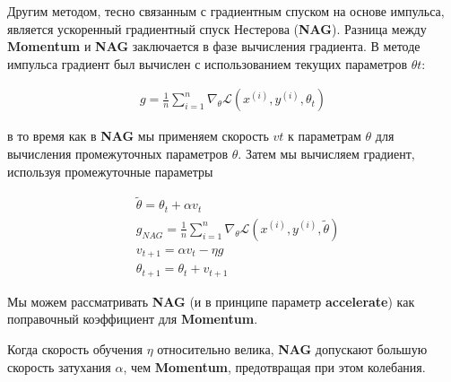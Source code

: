 {}\documentclass{article}
\begin{document}
    Другим методом, тесно связанным с градиентным спуском на основе импульса,
    является ускоренный градиентный спуск Нестерова (\textbf{NAG}).
    Разница между \textbf{Momentum} и \textbf{NAG} заключается в фазе вычисления градиента.
    В методе импульса градиент был вычислен с использованием текущих параметров $\theta t$:

    \begin{align}
        g=\frac{1}{n} \sum_{i=1}^n \nabla_\theta \mathcal{L}\left(x^{(i)}, y^{(i)}, \theta_t\right)
    \end{align}

    в то время как в \textbf{NAG} мы применяем скорость $vt$ к параметрам $\theta$ для вычисления
    промежуточных параметров $\theta$.
    Затем мы вычисляем градиент, используя промежуточные параметры

    \begin{equation}
        \begin{aligned}
            & \tilde{\theta}=\theta_t+\alpha v_t \\
            & g_{N A G} =\frac{1}{n} \sum_{i=1}^n \nabla_\theta \mathcal{L}\left(x^{(i)}, y^{(i)}, \tilde{\theta}\right) \\
            & v_{t+1} = \alpha v_t - \eta g \\
            & \theta_{t+1} = \theta_t + v_{t+1}
        \end{aligned}\label{eq:equation}
    \end{equation}

    Мы можем рассматривать \textbf{NAG} (и в принципе параметр \textbf{accelerate}) как поправочный коэффициент
    для \textbf{Momentum}.

    Когда скорость обучения $\eta$ относительно велика,
    \textbf{NAG} допускают большую скорость затухания $\alpha$, чем \textbf{Momentum}, предотвращая при этом колебания.
\end{document}
